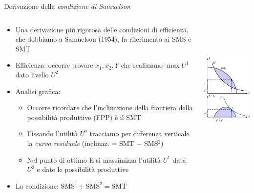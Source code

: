 \documentclass[aspectratio=149,11pt]{beamer}
\begin{document}
\begin{frame}{Derivazione della \emph{condizione di Samuelson}}
\begin{columns}
\begin{column}{.5\columnwidth}
\small
\begin{itemize}
\item Una derivazione più rigorosa delle condizioni di efficienza, che dobbiamo a
Samuelson (1954),  fa riferimento ai SMS e SMT
\item Efficienza: occorre trovare $x_{1},x_{2},Y$ che realizzano $\max U^{1}$
dato livello $U^{2}$
\item Analisi grafica:
\begin{itemize}
\item Occorre ricordare che l'inclinazione della frontiera della possibilità
produttive (FPP) è il SMT
\item Fissando l'utilità $U^{2}$ tracciamo per differenza verticale la \emph{curva
residuale} (inclinaz. = SMT $-$ SMS$^2$)
\item Nel punto di ottimo E si massimizza l'utilità $U^{1}$ data $U^{2}$ e date
le possibilità produttive
\end{itemize}
\item La condizione: $\text{SMS}^{1}+\text{SMS}^{2}=\text{SMT}$
\end{itemize}
\end{column}

\begin{column}{.5\columnwidth}
\begin{center}
\includegraphics[height=7cm]{./figure/samuelson-11.pdf}
\end{center} 
\end{column}
\end{columns}
\end{frame}
\end{document}
